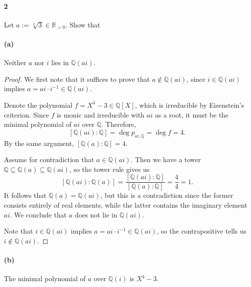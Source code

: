 \documentclass[12pt]{article}
\newlength{\myparskip}
\newenvironment{fullbox}{\begin{lrbox}{\savefullbox}\begin{minipage}{\dimexpr\textwidth-2\fboxsep\relax}\setlength{\parskip}{\myparskip}}{\end{minipage}\end{lrbox}\framebox[\textwidth]{\usebox{\savefullbox}}}
\newenvironment{pbox}[1][]{\begin{fullbox}\def\temp{#1}\ifx\temp\empty\else\paragraph{#1}\phantom{}\fi}{\end{fullbox}}
\theoremstyle{definition}
\newcommand{\Q}{\mathbb{Q}}
\newcommand{\R}{\mathbb{R}}
\newcommand{\<}{\langle}
\renewcommand{\>}{\rangle}
\newcommand{\seq}{\subseteq}
\begin{document}
\newpage
\begin{pbox}[2]
    Let $a := \sqrt[4]{3} \in \R_{>0}$.
    Show that
\end{pbox}

\begin{pbox}[(a)]
    Neither $a$ nor $i$ lies in $\Q(ai)$.
\end{pbox}

\begin{proof}
    We first note that it suffices to prove that $a \notin \Q(ai)$, since $i \in \Q(ai)$ implies $a = ai \cdot i^{-1} \in \Q(ai)$. 

    Denote the polynomial $f = X^4 - 3 \in \Q[X]$, which is irreducible by Eisenstein's criterion.
    Since $f$ is monic and irreducible with $ai$ as a root, it must be the minimal polynomial of $ai$ over $\Q$.
    Therefore,
    \[
        [\Q(ai) : \Q] = \deg p_{ai, \Q} = \deg f = 4.
    \]
    By the same argument, $[\Q(a) : \Q] = 4$.

    Assume for contradiction that $a \in \Q(ai)$.
    Then we have a tower $\Q \seq \Q(a) \seq \Q(ai)$, so the tower rule gives us
    \[
        [\Q(ai) : \Q(a)]
            = \frac{[\Q(ai) : \Q]}{[\Q(a) : \Q]}
            = \frac{4}{4}
            = 1.
    \]
    It follows that $\Q(a) = \Q(ai)$, but this is a contradiction since the former consists entirely of real elements, while the latter contains the imaginary element $ai$.
    We conclude that $a$ does not lie in $\Q(ai)$.

    Note that $i \in \Q(ai)$ implies $a = ai \cdot i^{-1} \in \Q(ai)$, so the contrapositive tells us $i \notin \Q(ai)$.
\end{proof}

\begin{pbox}[(b)]
    The minimal polynomial of $a$ over $\Q(i)$ is $X^4 - 3$.
\end{pbox}
\end{document}
